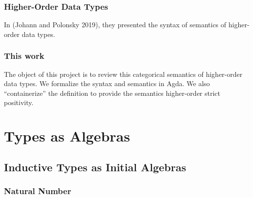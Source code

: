 \subsubsection*{Higher-Order Data Types}

In (Johann and Polonsky 2019)\cite{johann2019higher}, they presented the syntax of semantics of higher-order data types.

\subsubsection*{This work}

The object of this project is to review this categorical semantics of higher-order data types. We formalize the syntax and semantics in Agda. We also ``containerize'' the definition to provide the semantics higher-order strict positivity.

\section{Types as Algebras}

\subsection{Inductive Types as Initial Algebras}

\subsubsection*{Natural Number}

